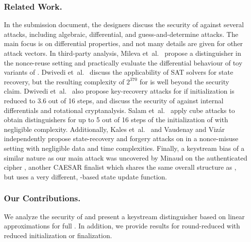 \subsubsection*{Related Work.}
In the \MORUS submission document, the designers discuss the security of \MORUS against
several attacks, including algebraic, differential, and guess-and-determine attacks.
The main focus is on differential properties, and not many details are given for other attack vectors.
In third-party analysis,
Mileva et~al.~\cite{balkancryptsecMilevaDV15} propose a distinguisher in the nonce-reuse setting and practically evaluate the differential behaviour of toy variants of \MORUS.
Dwivedi et~al.~\cite{cryptoeprint:2016:1053} discuss the applicability of SAT solvers for state recovery, but the resulting complexity of $2^{370}$ for \MORUS[640] is well beyond the security claim.
Dwivedi et~al.~\cite{secryptDwivediMW17} also propose key-recovery attacks for \MORUS[1280] if initialization is reduced to 3.6 out of 16 steps, and discuss the security of \MORUS against internal differentials and rotational cryptanalysis.
Salam et~al.~\cite{trustcomSalamSBDPW17} apply cube attacks to obtain distinguishers for up to 5 out of 16 steps of the initialization of \MORUS[1280] with negligible complexity.
Additionally, 
Kales et~al.~\cite{cryptoeprint:2017:1137} and
Vaudenay and Viz\'{a}r \cite{cryptoeprint:2017:1147}
independently propose state-recovery and forgery attacks on \MORUS in a nonce-misuse setting with negligible data and time complexities.
Finally, a keystream bias of a similar nature as our main attack was uncovered by Minaud \cite{sacryptMinaud14} on the authenticated cipher  \cite{AEGIS,sacryptWuP13}, another CAESAR finalist which shares the same overall structure as \MORUS, but uses a very different, -based state update function.

\subsubsection*{Our Contributions.}
We analyze the security of \MORUS and present a key\-stream distinguisher based on
linear approximations for full \MORUS[1280].
In addition, we provide results for round-reduced \MORUS with reduced initialization or finalization.

